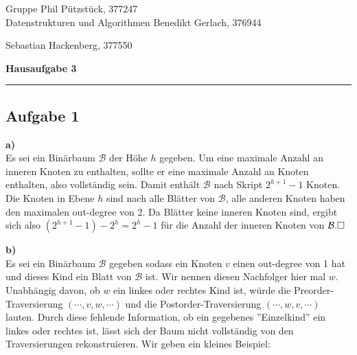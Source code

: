 \documentclass[a4paper,graphics,11pt]{article}
\newcommand{\aufgabe}[1]{\subsection*{Aufgabe #1}}
\begin{document}
\noindent Gruppe              \hfill Phil Pützstück, 377247\\
\noindent Datenstrukturen und Algorithmen \hfill Benedikt Gerlach, 376944\\
\strut\hfill Sebastian Hackenberg, 377550\\
\begin{center}
	\LARGE{\textbf{Hausaufgabe 3}}
\end{center}
\begin{center}
\rule[0.1ex]{\textwidth}{1pt}
\end{center}

\aufgabe{1}
\textbf{a)} \\
Es sei ein Binärbaum $\mathcal{B}$ der Höhe $h$ gegeben. Um eine maximale Anzahl an inneren Knoten zu enthalten, sollte er eine 
maximale Anzahl an Knoten enthalten, also vollständig sein.
Damit enthält $\mathcal{B}$ nach Skript $2^{h+1} - 1$ Knoten.
Die Knoten in Ebene $h$ sind nach alle Blätter von $\mathcal{B}$, alle anderen Knoten haben den maximalen out-degree
von 2. Da Blätter keine inneren Knoten sind, ergibt sich also $(2^{h+1} - 1) - 2^h = 2^h - 1$ für die Anzahl
der inneren Knoten von $\mathcal{B}.\hfill\square$

\textbf{b)}\\
Es sei ein Binärbaum $\mathcal{B}$ gegeben sodass ein Knoten $v$ einen out-degree von 1 hat und dieses Kind
ein Blatt von $\mathcal{B}$ ist.
Wir nennen diesen Nachfolger hier mal $w$. Unabhängig davon, ob $w$ ein linkes oder rechtes Kind ist,
würde die Preorder-Traversierung $(\cdots, v, w, \cdots)$ und die Postorder-Traversierung $(\cdots, w, v, \cdots)$
lauten. Durch diese fehlende Information, ob ein gegebenes ''Einzelkind'' ein linkes oder rechtes ist, lässt sich der Baum nicht vollständig von den Traversierungen rekonstruieren. Wir geben ein kleines Beispiel:

\begin{minipage}{.3\textwidth}
\strut\hfill
\end{minipage}
\begin{minipage}{.3\textwidth}
\end{minipage}
\begin{minipage}{.3\textwidth}
\end{minipage}
\end{document}
